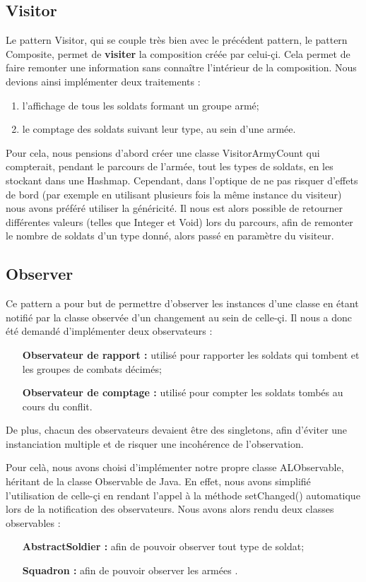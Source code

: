 ﻿\documentclass[12pt]{article}
\begin{document}
\subsection{Visitor}
Le pattern Visitor, qui se couple très bien avec le précédent pattern, le pattern Composite, permet de \textbf{visiter} la composition créée par celui-çi. Cela permet de faire remonter une information sans connaître l'intérieur de la composition.
Nous devions ainsi implémenter deux traitements :
\begin{enumerate}
 \item l'affichage de tous les soldats formant un groupe armé;
 \item le comptage des soldats suivant leur type, au sein d'une armée.
\end{enumerate}
Pour cela, nous pensions d'abord créer une classe VisitorArmyCount qui compterait, pendant le parcours de l'armée, tout les types de soldats, en les stockant dans une Hashmap. Cependant, dans l'optique de ne pas risquer d'effets de bord (par exemple en utilisant plusieurs fois la même instance du visiteur) nous avons préféré utiliser la généricité. Il nous est alors possible de retourner différentes valeurs (telles que Integer et Void) lors du parcours, afin de remonter le nombre de soldats d'un type donné, alors passé en paramètre du visiteur.
\subsection{Observer}
Ce pattern a pour but de permettre d'observer les instances d'une classe en étant notifié par la classe observée d'un changement au sein de celle-çi. Il nous a donc été demandé d'implémenter deux observateurs :
\begin{enumerate}
\item[\textbf{Observateur de rapport :}] utilisé pour rapporter les soldats qui tombent et les groupes de combats décimés; 
\item[\textbf{Observateur de comptage :}] utilisé pour compter les soldats tombés au cours du conflit. 
\end{enumerate}
De plus, chacun des observateurs devaient être des singletons, afin d'éviter une instanciation multiple et de risquer une incohérence de l'observation.

Pour celà, nous avons choisi d'implémenter notre propre classe ALObservable, héritant de la classe Observable de Java. En effet, nous avons simplifié l'utilisation de celle-çi en rendant l'appel à la méthode setChanged() automatique lors de la notification des observateurs.
Nous avons alors rendu deux classes observables :
\begin{enumerate}
\item[\textbf{AbstractSoldier :}] afin de pouvoir observer tout type de soldat;
\item[\textbf{Squadron :}] afin de pouvoir observer les armées .
\end{enumerate}
\end{document}
